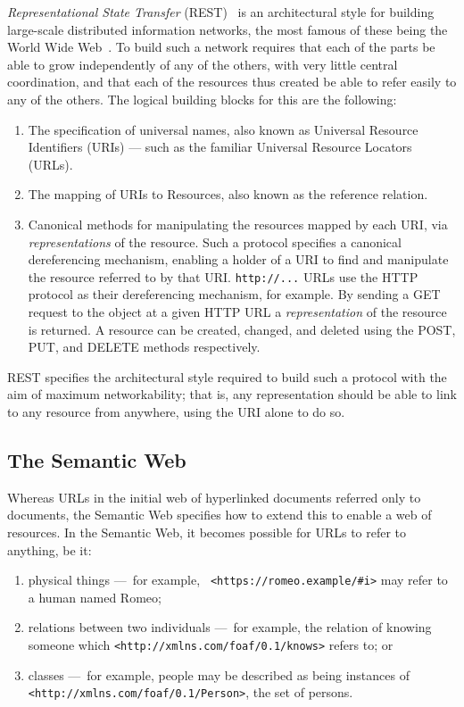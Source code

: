 \documentclass{llncs}
\begin{document}
{\em Representational State Transfer} (REST)~\cite[Chap.~5]{fielding2000phd}
is an architectural style for
building large-scale distributed information networks, the most famous
of these being the World Wide Web~\cite{WebArchVol1}.  To build such a
network requires that each of the parts be able to grow independently
of any of the others, with very little central coordination, and that
each of the resources thus created be able to refer easily to any of
the others.
%
The logical building blocks for this are the following:
\begin{enumerate}
\item The specification of universal names, also known as Universal
  Resource Identifiers (URIs) --- such as the familiar Universal Resource Locators (URLs).
\item The mapping of URIs to Resources, also known as the reference relation.
\item Canonical methods for manipulating the resources mapped by each
  URI, via {\em representations} of the resource.  Such a protocol
  specifies a canonical dereferencing mechanism, enabling a holder of
  a URI to find and manipulate the resource referred to by that URI.
  {\tt http://...} URLs use the HTTP protocol as their dereferencing
  mechanism, for example.  By sending a GET request to the object at a given HTTP
  URL a  {\em
    representation} of the resource is returned.  A resource can
  be created,  changed, and deleted using the POST, PUT, and DELETE methods 
  respectively.
  \end{enumerate}

REST specifies the architectural style required to build such a
protocol with the aim of maximum networkability; that is, any
representation should be able to link to any resource from anywhere,
using the URI alone to do so.

\subsection{The Semantic Web}

Whereas URLs in the initial web of hyperlinked documents referred only
to documents, the Semantic Web specifies how to extend this to enable
a web of resources. In the Semantic Web, it becomes
possible for URLs to refer to anything, be it:
\begin{enumerate}
\item physical things ---~for example, {\tt
  <https://romeo.example/\#i>}
may refer to a human named Romeo;
\item relations between two individuals ---~for example, the relation of
  knowing someone which {\tt <http://xmlns.com/foaf/0.1/knows>} refers
  to; or
\item classes ---~for example, people may be described as being instances of {\tt
  <http://xmlns.com/foaf/0.1/Person>}, the set of persons.
\end{enumerate}
\end{document}
